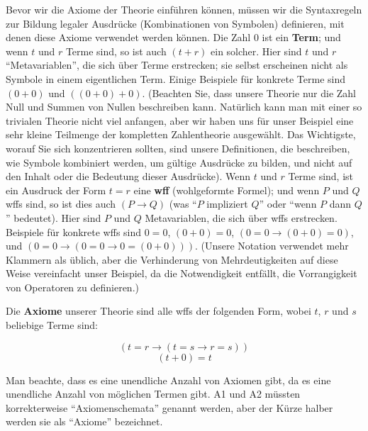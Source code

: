 Bevor wir die Axiome der Theorie einführen können, müssen wir die Syntaxregeln zur Bildung legaler Ausdrücke (Kombinationen von Symbolen) definieren, mit denen diese Axiome verwendet werden können. Die Zahl 0 ist ein {\bf Term}; und wenn $ t$ und $r$ Terme sind, so ist auch $(t+r)$ ein solcher. Hier sind $ t$ und $r$ "`Metavariablen"', die sich über Terme erstrecken; sie selbst erscheinen nicht als Symbole in einem eigentlichen Term.  Einige Beispiele für konkrete Terme sind $(0 + 0)$ und $((0+0)+0)$. (Beachten Sie, dass unsere Theorie nur die Zahl Null und Summen von Nullen beschreiben kann.  Natürlich kann man mit einer so trivialen Theorie nicht viel anfangen, aber wir haben uns für unser Beispiel eine sehr kleine Teilmenge der kompletten Zahlentheorie ausgewählt.  Das Wichtigste, worauf Sie sich konzentrieren sollten, sind unsere Definitionen, die beschreiben, wie Symbole kombiniert werden, um gültige Ausdrücke zu bilden, und nicht auf den Inhalt oder die Bedeutung dieser Ausdrücke). Wenn $ t$ und $r$ Terme sind, ist ein Ausdruck der Form $ t=r$ eine {\bf wff} (wohlgeformte Formel); und wenn $P$ und $Q$ wffs sind, so ist dies auch $(P\rightarrow Q)$ (was "`$P$ impliziert $Q$"' oder "`wenn $P$ dann $Q$"' bedeutet).
Hier sind $P$ und $Q$ Metavariablen, die sich über wffs erstrecken.  Beispiele für konkrete wffs sind $0=0$, $(0+0)=0$, $(0=0 \rightarrow (0+0)=0)$, und $(0=0\rightarrow
(0=0\rightarrow 0=(0+0)))$. (Unsere Notation verwendet mehr Klammern als üblich, aber die Verhinderung von Mehrdeutigkeiten auf diese Weise vereinfacht unser Beispiel, da die Notwendigkeit entfällt, die Vorrangigkeit von Operatoren zu definieren.)

Die {\bf Axiome} unserer Theorie sind alle wffs der folgenden Form, wobei $ t$, $r$ und $s$ beliebige Terme sind:

\renewcommand{\theequation}{A\arabic{equation}}

\begin{equation}
(t=r\rightarrow (t=s\rightarrow r=s))
\end{equation}
\begin{equation}
(t+0)=t
\end{equation}

Man beachte, dass es eine unendliche Anzahl von Axiomen gibt, da es eine unendliche Anzahl von möglichen Termen gibt.  A1 und A2 müssten korrekterweise "`Axiomenschemata"' genannt werden, aber der Kürze halber werden sie als "`Axiome"' bezeichnet.

